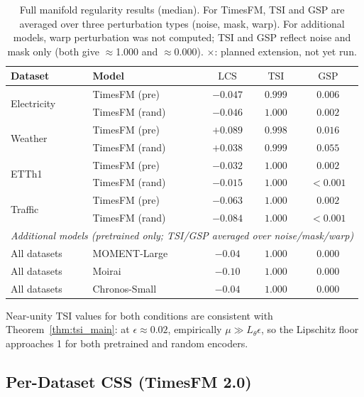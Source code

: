 \documentclass[10pt]{article}
\theoremstyle{definition}
\theoremstyle{remark}
\newcommand{\lcs}{\ensuremath{\mathrm{LCS}}}
\newcommand{\tsi}{\ensuremath{\mathrm{TSI}}}
\newcommand{\gsp}{\ensuremath{\mathrm{GSP}}}
\begin{document}
\begin{table}[h]
\centering
\caption{Full manifold regularity results (median). For TimesFM, TSI and GSP
are averaged over three perturbation types (noise, mask, warp). For additional
models, warp perturbation was not computed; TSI and GSP reflect noise and mask
only (both give $\approx$1.000 and $\approx$0.000).
$\times$: planned extension, not yet run.}
\label{tab:regularity_full}
\small
\setlength{\tabcolsep}{5pt}
\begin{tabular}{llccc}
\toprule
\textbf{Dataset} & \textbf{Model} & \lcs & \tsi & \gsp\\
\midrule
\multirow{2}{*}{Electricity}
  & TimesFM (pre)  & $-0.047$ & $0.999$ & $0.006$\\
  & TimesFM (rand) & $-0.046$ & $1.000$ & $0.002$\\
\midrule
\multirow{2}{*}{Weather}
  & TimesFM (pre)  & $+0.089$ & $0.998$ & $0.016$\\
  & TimesFM (rand) & $+0.038$ & $0.999$ & $0.055$\\
\midrule
\multirow{2}{*}{ETTh1}
  & TimesFM (pre)  & $-0.032$ & $1.000$ & $0.002$\\
  & TimesFM (rand) & $-0.015$ & $1.000$ & ${<}0.001$\\
\midrule
\multirow{2}{*}{Traffic}
  & TimesFM (pre)  & $-0.063$ & $1.000$ & $0.002$\\
  & TimesFM (rand) & $-0.084$ & $1.000$ & ${<}0.001$\\
\midrule
\multicolumn{5}{l}{\textit{Additional models (pretrained only; TSI/GSP averaged over noise/mask/warp)}}\\
All datasets & MOMENT-Large  & $-0.04$ & $1.000$ & $0.000$\\
All datasets & Moirai        & $-0.10$ & $1.000$ & $0.000$\\
All datasets & Chronos-Small & $-0.04$ & $1.000$ & $0.000$\\
\bottomrule
\end{tabular}
\end{table}

Near-unity TSI values for both conditions are consistent with
Theorem~\ref{thm:tsi_main}: at $\epsilon\approx0.02$, empirically
$\mu \gg L_\theta\epsilon$, so the Lipschitz floor approaches 1 for both
pretrained and random encoders.

\subsection{Per-Dataset CSS (TimesFM 2.0)}
\label{app:probing_detail}
\end{document}
